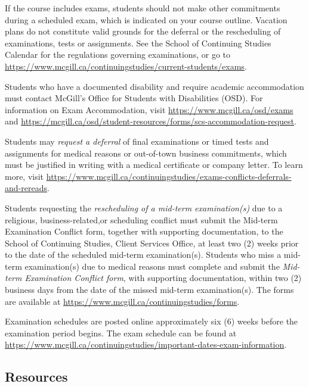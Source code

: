 \documentclass{article}
\begin{document}
If the course includes exams, students should not make other
commitments during a scheduled exam, which is indicated on your course
outline. Vacation plans do not constitute valid grounds for the
deferral or the rescheduling of examinations, tests or
assignments. See the School of Continuing Studies Calendar for the
regulations governing examinations, or go to
\url{https://www.mcgill.ca/continuingstudies/current-students/exams}.

Students who have a documented disability and require academic
accommodation must contact McGill's Office for Students with
Disabilities (OSD). For information on Exam Accommodation, visit
\url{https://www.mcgill.ca/osd/exams} and
\url{https://mcgill.ca/osd/student-resources/forms/scs-accommodation-request}.


Students may {\em request a deferral} of final examinations or timed
tests and assignments for medical reasons or out-of-town business
commitments, which must be justified in writing with a medical
certificate or company letter. To learn more, visit
\url{https://www.mcgill.ca/continuingstudies/exams-conflicts-deferrals-and-rereads}.


Students requesting the {\em rescheduling of a mid-term
  examination(s)} due to a religious, business-related,or scheduling
conflict must submit the Mid-term Examination Conflict form, together
with supporting documentation, to the School of Continuing Studies,
Client Services Office, at least two (2) weeks prior to the date of
the scheduled mid-term examination(s). Students who miss a mid-term
examination(s) due to medical reasons must complete and submit the
{\em Mid-term Examination Conflict form}, with supporting documentation,
within two (2) business days from the date of the missed
mid-term examination(s). The forms are available at
\url{https://www.mcgill.ca/continuingstudies/forms}.

Examination schedules are posted online approximately six (6) weeks
before the examination period begins. The exam schedule can be found
at
\url{https://www.mcgill.ca/continuingstudies/important-dates-exam-information}.

\newpage

\subsection{Resources }
\end{document}
